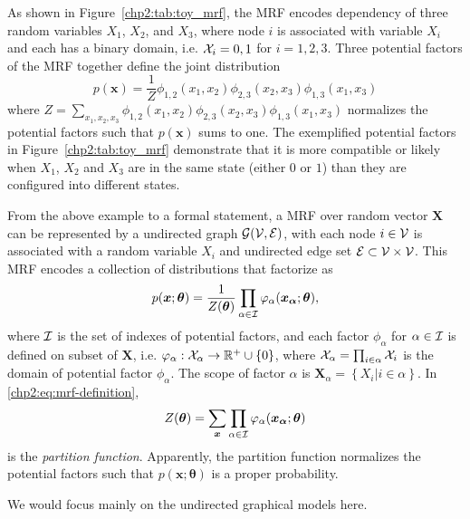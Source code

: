 \begin{example}\label{chpt2:mrf-3node-example}
  As shown in Figure~\ref{chp2:tab:toy_mrf}, the MRF encodes dependency of three random variables $X_1$, $X_2$, and $X_3$, where node $i$ is associated with variable $X_i$ and each has a binary domain, i.e. $\mathcal{X}_i = {0,1}$ for $i =1,2,3$. Three potential factors of the MRF together define the joint distribution
  \begin{equation*}
    p(\bm{x}) = \frac{1}{Z} \phi_{1,2}(x_1, x_2) \phi_{2,3}(x_2, x_3) \phi_{1,3}(x_1, x_3)
  \end{equation*}
  where $Z = \sum_{x_1, x_2, x_3}\phi_{1,2}(x_1, x_2) \phi_{2,3}(x_2, x_3) \phi_{1,3}(x_1, x_3)$ normalizes the potential factors such that $p(\bm{x})$ sums to one. The exemplified potential factors in Figure~\ref{chp2:tab:toy_mrf} demonstrate that it is more compatible or likely when $X_1$, $X_2$ and $X_3$ are in the same state (either $0$ or $1$) than they are configured into different states.
\end{example}

From the above example to a formal statement, a MRF over random vector $\bm{X}$ can be represented by a undirected graph $\mathcal{G}(\mathcal{V}, \mathcal{E})$, with each node $i \in \mathcal{V}$ is associated with a random variable $X_i$ and undirected edge set $\mathcal{E} \subset \mathcal{V} \times \mathcal{V}$. This MRF encodes a collection of distributions that factorize as
\begin{equation}\label{chp2:eq:mrf-definition}
  p(\bm{x};\bm{\theta}) = \frac{1}{Z(\bm{\theta})} \prod_{\alpha \in \mathcal{I}} \varphi_{\alpha}(\bm{x_{\alpha}};\bm{\theta}),
\end{equation}
where $\mathcal{I}$ is the set of indexes of potential factors, and each factor $\phi_{\alpha}$ for $\alpha\in \mathcal{I}$ is defined on subset of $\bm{X}$, i.e. $\varphi_{\alpha}: \mathcal{X}_{\alpha} \rightarrow \mathbb{R}^{+} \cup \{0\}$, where $\mathcal{X}_{\alpha} = \prod_{i\in \alpha}\mathcal{X}_i$ is the domain of potential factor $\phi_{\alpha}$. The scope of factor $\alpha$ is $\bm{X}_{\alpha} = \left\{ X_i| i\in \alpha \right\}$. In \eqref{chp2:eq:mrf-definition},
\begin{equation}
  Z(\bm{\theta}) = \sum_{\bm{x}} \prod_{\alpha \in \mathcal{I}} \varphi_{\alpha}(\bm{x_{\alpha}};\bm{\theta})
\end{equation}
is the \textit{partition function}. Apparently, the partition function normalizes the potential factors such that $p(\bm{x}; \bm{\theta})$ is a proper probability.


We would focus mainly on the undirected graphical models here.


